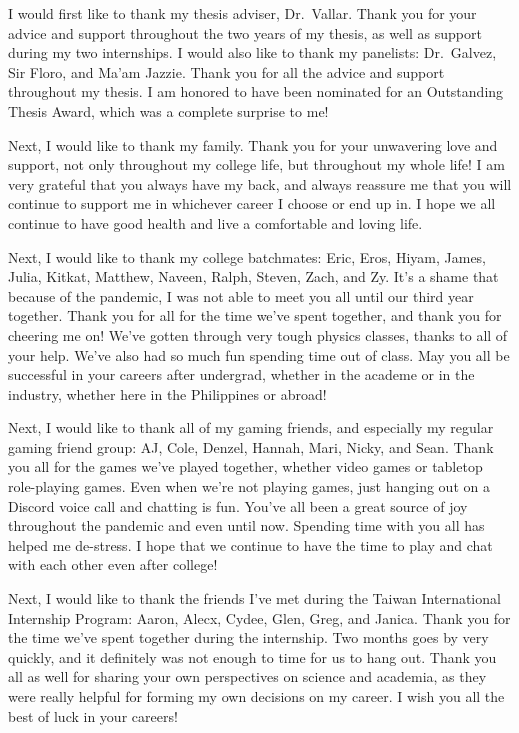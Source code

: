 I would first like to thank my thesis adviser, Dr.\ Vallar.
Thank you for your advice and support throughout the two years of my thesis, 
as well as support during my two internships.
I would also like to thank my panelists: Dr.\ Galvez, Sir Floro, and Ma'am Jazzie.
Thank you for all the advice and support throughout my thesis.
I am honored to have been nominated for an Outstanding Thesis Award,
which was a complete surprise to me!

Next, I would like to thank my family.
Thank you for your unwavering love and support, not only throughout my college life, but throughout my whole life!
I am very grateful that you always have my back, and always reassure me that you will continue to support me in whichever career I choose or end up in.
I hope we all continue to have good health and live a comfortable and loving life.

Next, I would like to thank my college batchmates:
	Eric, Eros, Hiyam, James, Julia, Kitkat, Matthew, Naveen, Ralph, Steven, Zach, and Zy.
It's a shame that because of the pandemic, I was not able to meet you all until our third year together.
Thank you for all for the time we've spent together, and thank you for cheering me on!
We've gotten through very tough physics classes, thanks to all of your help.
We've also had so much fun spending time out of class.
May you all be successful in your careers after undergrad, whether in the academe or in the industry, whether here in the Philippines or abroad!

Next, I would like to thank all of my gaming friends, and especially my regular gaming friend group: 
	AJ, Cole, Denzel, Hannah, Mari, Nicky, and Sean.
Thank you all for the games we've played together, whether video games or tabletop role-playing games.
Even when we're not playing games, just hanging out on a Discord voice call and chatting is fun.
You've all been a great source of joy throughout the pandemic and even until now.
Spending time with you all has helped me de-stress.
I hope that we continue to have the time to play and chat with each other even after college!

Next, I would like to thank the friends I've met during the Taiwan International Internship Program:
	Aaron, Alecx, Cydee, Glen, Greg, and Janica.
Thank you for the time we've spent together during the internship.
Two months goes by very quickly, and it definitely was not enough to time for us to hang out.
Thank you all as well for sharing your own perspectives on science and academia, as they were really helpful for forming my own decisions on my career.
I wish you all the best of luck in your careers!

